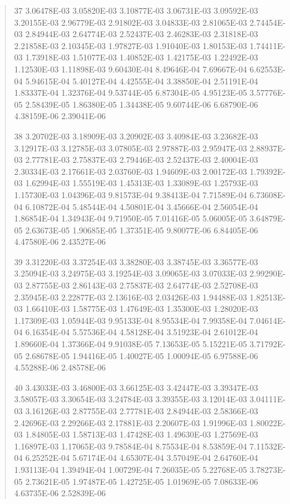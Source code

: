 \documentclass[letterpaper,10pt,english]{sphinxmanual}
\begin{document}
\begin{quote}
\begin{DUlineblock}{0em}
\item[] 37   3.06478E-03  3.05820E-03  3.10877E-03  3.06731E-03  3.09592E-03  3.20155E-03  2.96779E-03  2.91802E-03  3.04833E-03  2.81065E-03  2.74454E-03  2.84944E-03  2.64774E-03  2.52437E-03  2.46283E-03  2.31818E-03  2.21858E-03  2.10345E-03  1.97827E-03  1.91040E-03  1.80153E-03  1.74411E-03  1.73918E-03  1.51077E-03  1.40852E-03  1.42175E-03  1.22492E-03  1.12530E-03  1.11898E-03  9.60430E-04  8.49646E-04  7.69667E-04  6.62553E-04  5.94615E-04  5.40127E-04  4.42555E-04  3.38850E-04  2.51191E-04  1.83337E-04  1.32376E-04  9.53744E-05  6.87304E-05  4.95123E-05  3.57776E-05  2.58439E-05  1.86380E-05  1.34438E-05  9.60744E-06  6.68790E-06  4.38159E-06  2.39041E-06
\item[] 38   3.20702E-03  3.18909E-03  3.20902E-03  3.40984E-03  3.23682E-03  3.12917E-03  3.12785E-03  3.07805E-03  2.97887E-03  2.95947E-03  2.88937E-03  2.77781E-03  2.75837E-03  2.79446E-03  2.52437E-03  2.40004E-03  2.30334E-03  2.17661E-03  2.03760E-03  1.94609E-03  2.00172E-03  1.79392E-03  1.62994E-03  1.55519E-03  1.45313E-03  1.33089E-03  1.25793E-03  1.15730E-03  1.04396E-03  9.81573E-04  9.38413E-04  7.71589E-04  6.73608E-04  6.10872E-04  5.48544E-04  4.50801E-04  3.45666E-04  2.56054E-04  1.86854E-04  1.34943E-04  9.71950E-05  7.01416E-05  5.06005E-05  3.64879E-05  2.63673E-05  1.90685E-05  1.37351E-05  9.80077E-06  6.84405E-06  4.47580E-06  2.43527E-06
\item[] 39   3.31220E-03  3.37254E-03  3.38280E-03  3.38745E-03  3.36577E-03  3.25094E-03  3.24975E-03  3.19254E-03  3.09065E-03  3.07033E-03  2.99290E-03  2.87755E-03  2.86143E-03  2.75837E-03  2.64774E-03  2.52708E-03  2.35945E-03  2.22877E-03  2.13616E-03  2.03426E-03  1.94488E-03  1.82513E-03  1.66410E-03  1.58775E-03  1.47649E-03  1.35300E-03  1.28020E-03  1.17309E-03  1.05944E-03  9.95133E-04  8.95534E-04  7.99358E-04  7.04614E-04  6.16354E-04  5.57536E-04  4.58128E-04  3.51923E-04  2.61012E-04  1.89660E-04  1.37366E-04  9.91038E-05  7.13653E-05  5.15221E-05  3.71792E-05  2.68678E-05  1.94416E-05  1.40027E-05  1.00094E-05  6.97588E-06  4.55288E-06  2.48578E-06
\item[] 40   3.43033E-03  3.46800E-03  3.66125E-03  3.42447E-03  3.39347E-03  3.58057E-03  3.30654E-03  3.24784E-03  3.39355E-03  3.12014E-03  3.04111E-03  3.16126E-03  2.87755E-03  2.77781E-03  2.84944E-03  2.58366E-03  2.42696E-03  2.29266E-03  2.17881E-03  2.20607E-03  1.91996E-03  1.80022E-03  1.84805E-03  1.58713E-03  1.47428E-03  1.49630E-03  1.27569E-03  1.16897E-03  1.17065E-03  9.78584E-04  8.75534E-04  8.53859E-04  7.11532E-04  6.25252E-04  5.67174E-04  4.65307E-04  3.57049E-04  2.64760E-04  1.93113E-04  1.39494E-04  1.00729E-04  7.26035E-05  5.22768E-05  3.78273E-05  2.73621E-05  1.97487E-05  1.42725E-05  1.01969E-05  7.08633E-06  4.63735E-06  2.52839E-06

\end{DUlineblock}
\end{quote}
\end{document}
